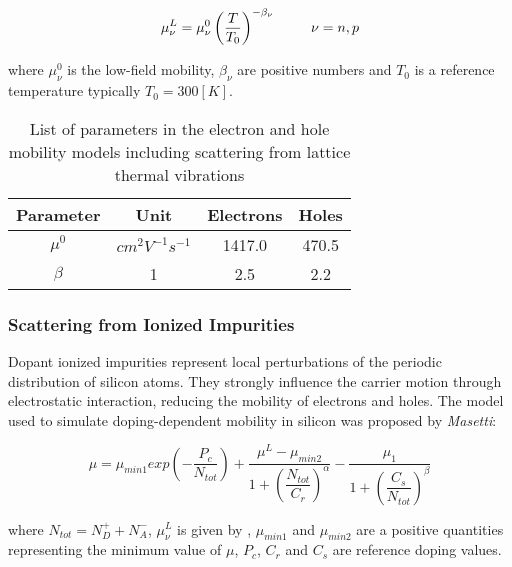 \begin{equation}
\label{eq: mobility thermal}
\mu_\nu^L = \mu_\nu^0\left( \dfrac{T}{T_0}\right)^{-\beta_\nu} \psp{15} \nu = n,p
\end{equation}



where $\mu_\nu^0$ is the low-field mobility, $\beta_\nu$ are positive numbers and $T_0$ is a reference temperature typically $T_0=300[K]$.

\begin{table}
\centering
\begin{tabular}{cccc}
\toprule
Parameter & Unit & Electrons & Holes \\
\midrule
$\mu^0$ & $cm^2V^{-1}s^{-1}$ & 1417.0 & 470.5\\
$\beta$ & 1 & 2.5 & 2.2\\
\bottomrule
\end{tabular}
\caption{List of parameters in the electron and hole mobility models including scattering from lattice thermal vibrations}
\end{table}

\subsubsection{Scattering from Ionized Impurities}
Dopant ionized impurities represent local perturbations of the periodic distribution of silicon atoms. They strongly influence the carrier motion through electrostatic interaction, reducing the mobility of electrons and holes. The model used to simulate doping-dependent mobility in silicon was proposed by \textit{Masetti}:


\begin{equation}
\label{eq: mobility impurities}
\mu = \mu_{min1}exp\left( 	- \dfrac{P_c}{N_{tot}}\right)
 + \dfrac{\mu^L-\mu_{min2}}{1 + \left( \dfrac{N_{tot}}{C_r} \right)^{\alpha} } 
 - \dfrac{\mu_1}{1 + \left( \dfrac{C_s}{N_{tot}} \right)^{\beta} } 
\end{equation}

where $N_{tot} = N_D^+ + N_A^-$, $\mu_\nu^L$ is given by , $\mu_{min1}$ and $\mu_{min2}$  are a positive quantities representing the minimum value of $\mu$, $P_c$, $C_r$ and $C_s$ are reference doping values.



